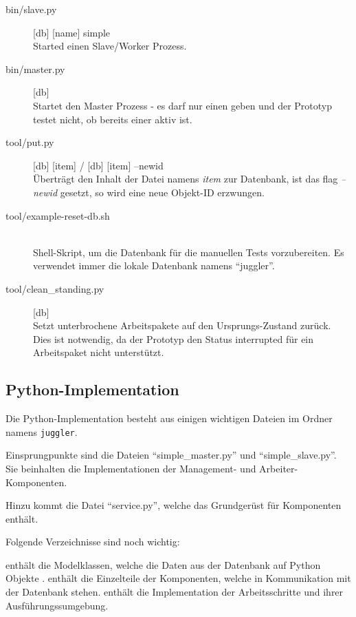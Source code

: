 \begin{description}
    \item[bin/slave.py] [db] [name] simple \hfill \\
        Started einen Slave/Worker Prozess.
    \item[bin/master.py] [db] \hfill \\
        Startet den Master Prozess - es darf nur einen geben und der Prototyp testet nicht, ob bereits einer aktiv ist.
    \item[tool/put.py] [db] [item] / [db] [item] --newid \hfill \\
        Überträgt den Inhalt der Datei namens \textit{item} zur Datenbank,
        ist das flag \textit{--newid} gesetzt, so wird eine neue Objekt-ID erzwungen.
    \item[tool/example-reset-db.sh] \hfill \\
        Shell-Skript, um die Datenbank für die manuellen Tests vorzubereiten.
        Es verwendet immer die lokale Datenbank namens ``juggler''.
    \item[tool/clean\_standing.py] [db]\hfill \\
        Setzt unterbrochene Arbeitspakete auf den Ursprungs-Zustand zurück.
        Dies ist notwendig, da der Prototyp den Status interrupted für ein Arbeitspaket nicht unterstützt.
\end{description}

\subsection{Python-Implementation}

Die Python-Implementation besteht aus einigen wichtigen Dateien im Ordner namens \verb|juggler|.

Einsprungpunkte sind die Dateien ``simple\_master.py'' und ``simple\_slave.py''.
Sie beinhalten die Implementationen der Management- und Arbeiter-Komponenten.

Hinzu kommt die Datei ``service.py'', welche das Grundgerüst für Komponenten enthält.

Folgende Verzeichnisse sind noch wichtig:

\begin{description}
    \dhitem[model] 
        enthält  die Modelklassen,
        welche die Daten aus der Datenbank auf Python Objekte .
    \dhitem[handler] 
        enthält die Einzelteile der Komponenten,
        welche in Kommunikation mit der Datenbank stehen.
    \dhitem[process]
        enthält die Implementation der Arbeitsschritte
        und ihrer Ausführungssumgebung.
\end{description}



